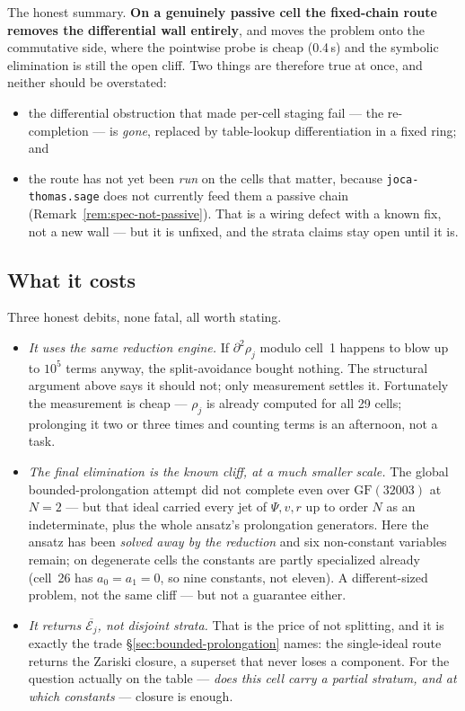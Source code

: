 \documentclass[11pt]{article}
\newcommand{\Psib}{\Psi}
\newcommand{\Ex}{\mathcal{E}}
\newcommand{\code}[1]{\texttt{#1}}
\begin{document}
The honest summary. \textbf{On a genuinely passive cell the fixed-chain route
removes the differential wall entirely}, and moves the problem onto the
commutative side, where the pointwise probe is cheap (0.4\,s) and the symbolic
elimination is still the open cliff. Two things are therefore true at once, and
neither should be overstated:
\begin{itemize}
\item the differential obstruction that made per-cell staging fail --- the
  re-completion --- is \emph{gone}, replaced by table-lookup differentiation in a
  fixed ring; and
\item the route has not yet been \emph{run} on the cells that matter, because
  \code{joca-thomas.sage} does not currently feed them a passive chain
  (Remark~\ref{rem:spec-not-passive}). That is a wiring defect with a known fix,
  not a new wall --- but it is unfixed, and the strata claims stay open until it
  is.
\end{itemize}

\subsection{What it costs}

Three honest debits, none fatal, all worth stating.

\begin{itemize}
\item \emph{It uses the same reduction engine.} If $\partial^2\rho_j$ modulo
  cell~1 happens to blow up to $10^5$ terms anyway, the split-avoidance bought
  nothing. The structural argument above says it should not; only measurement
  settles it. Fortunately the measurement is cheap --- $\rho_j$ is already
  computed for all 29 cells; prolonging it two or three times and counting
  terms is an afternoon, not a task.
\item \emph{The final elimination is the known cliff, at a much smaller
  scale.} The global bounded-prolongation attempt did not complete even over
  $\mathrm{GF}(32003)$ at $N=2$ --- but that ideal carried every jet of
  $\Psib, v, r$ up to order $N$ as an indeterminate, plus the whole ansatz's
  prolongation generators. Here the ansatz has been \emph{solved away by the
  reduction} and six non-constant variables remain; on degenerate cells the
  constants are partly specialized already (cell~26 has $a_0=a_1=0$, so nine
  constants, not eleven). A different-sized problem, not the same cliff ---
  but not a guarantee either.
\item \emph{It returns $\overline{\Ex_j}$, not disjoint strata.} That is the
  price of not splitting, and it is exactly the trade
  \S\ref{sec:bounded-prolongation} names: the single-ideal route returns the
  Zariski closure, a superset that never loses a component. For the question
  actually on the table --- \emph{does this cell carry a partial stratum, and
  at which constants} --- closure is enough.
\end{itemize}
\end{document}
